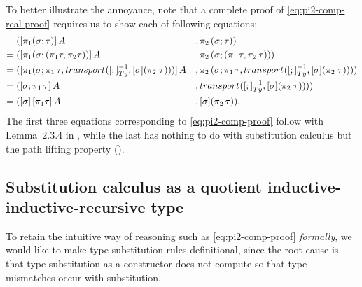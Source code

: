 \documentclass[a4paper,UKenglish,numberwithinsect,cleveref,thm-restate]{lipics-v2021}
\begin{document}
\begin{example}
  To better illustrate the annoyance, note that a complete proof of \eqref{eq:pi2-comp-real-proof} requires us to show each of following equations:
  \begin{alignat*}{3}
         & ([\pi_1(\sigma; \tau)]\,A                    &&, \pi_2\,(\sigma ; \tau)) \\
    = {} & ([\pi_1(\sigma; (\pi_1\tau , \pi_2\tau))]\,A &&, \pi_2\,(\sigma; (\pi_1\,\tau, \pi_2\,\tau))) \\
    = {} & ([\pi_1(\sigma;\pi_1\,\tau, \transfib{}{[;]_{\Ty}^{-1}}{\color{black}[ \sigma ] (\pi_2\;\tau)})]\,A &&, \pi_2\,(\sigma;\pi_1\,\tau, \transfib{}{[;]_{\Ty}^{-1}}{\color{black}[ \sigma ] (\pi_2\;\tau)})) \\
    = {} & ([\sigma;\pi_1\,\tau]\,A &&, \transfib{}{[;]_{\Ty}^{-1}}{\color{black}[ \sigma ] (\pi_2\;\tau)})) \nonumber \\
    = {} & (\sub{\sigma}{\sub{\pi_1\tau}{A}} &&, [\sigma] (\pi_2\,\tau)). \nonumber
  \end{alignat*}
  The first three equations corresponding to \eqref{eq:pi2-comp-proof} follow with Lemma~2.3.4 in \cite{UFP2013}, while the last has nothing to do with substitution calculus but the path lifting property (\cite[Lemma~2.3.2]{UFP2013}).
\end{example}

\subsection{Substitution calculus as a quotient inductive-inductive-recursive type} \label{subsec:SC-QIIRT}

To retain the intuitive way of reasoning such as \eqref{eq:pi2-comp-proof} \emph{formally}, we would like to make type substitution rules definitional, since the root cause is that type substitution as a constructor does not compute so that type mismatches occur with substitution.
\end{document}
